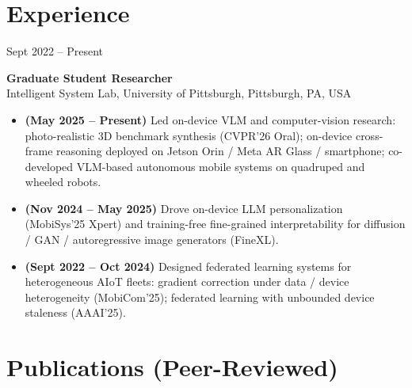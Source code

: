 \documentclass[11pt, letterpaper]{article}
\newenvironment{datedentry}[1]{%
  \par\noindent
  \begin{minipage}[t]{2.8cm}\raggedright\small #1\end{minipage}%
  \hspace{0.3cm}%
  \begin{minipage}[t]{\dimexpr\linewidth-3.1cm\relax}\raggedright
}{\end{minipage}\par\medskip}
\begin{document}
\section{Experience}

\begin{datedentry}{Sept 2022 -- Present}
\textbf{Graduate Student Researcher}\\
Intelligent System Lab, University of Pittsburgh, Pittsburgh, PA, USA
\begin{itemize}[leftmargin=1.1em, itemsep=2pt, topsep=3pt]
  \item \textbf{(May 2025 -- Present)} Led on-device VLM and computer-vision research: photo-realistic 3D benchmark synthesis (CVPR'26 Oral); on-device cross-frame reasoning deployed on Jetson Orin / Meta AR Glass / smartphone; co-developed VLM-based autonomous mobile systems on quadruped and wheeled robots.
  \item \textbf{(Nov 2024 -- May 2025)} Drove on-device LLM personalization (MobiSys'25 Xpert) and training-free fine-grained interpretability for diffusion / GAN / autoregressive image generators (FineXL).
  \item \textbf{(Sept 2022 -- Oct 2024)} Designed federated learning systems for heterogeneous AIoT fleets: gradient correction under data / device heterogeneity (MobiCom'25); federated learning with unbounded device staleness (AAAI'25).
\end{itemize}
\end{datedentry}

\section{Publications (Peer-Reviewed)}
\end{document}
